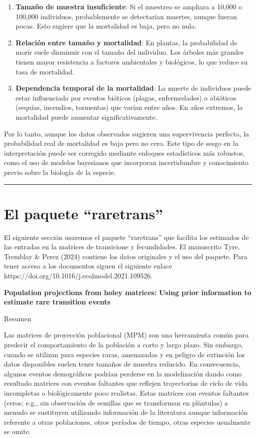 \documentclass[
  12pt,
  letterpaper,
]{book}
\begin{document}
\begin{enumerate}
\def\labelenumi{\arabic{enumi}.}
\item
  \textbf{Tamaño de muestra insuficiente}: Si el muestreo se ampliara a
  10,000 o 100,000 individuos, probablemente se detectarían muertes,
  aunque fueran pocas. Esto sugiere que la mortalidad es baja, pero no
  nula.
\item
  \textbf{Relación entre tamaño y mortalidad}: En plantas, la
  probabilidad de morir suele disminuir con el tamaño del individuo. Los
  árboles más grandes tienen mayor resistencia a factores ambientales y
  biológicos, lo que reduce su tasa de mortalidad.
\item
  \textbf{Dependencia temporal de la mortalidad}: La muerte de
  individuos puede estar influenciada por eventos bióticos (plagas,
  enfermedades) o abióticos (sequías, incendios, tormentas) que varían
  entre años. En años extremos, la mortalidad puede aumentar
  significativamente.
\end{enumerate}

Por lo tanto, aunque los datos observados sugieren una supervivencia
perfecta, la probabilidad real de mortalidad es baja pero no cero. Este
tipo de sesgo en la interpretación puede ser corregido mediante enfoques
estadísticos más robustos, como el uso de modelos bayesianos que
incorporan incertidumbre y conocimiento previo sobre la biología de la
especie.

\begin{center}\rule{0.5\linewidth}{0.5pt}\end{center}

\section{El paquete ``raretrans''}\label{el-paquete-raretrans}

El siguiente sección usaremos el paquete ``raretrans'' que facilita los
estimados de las entradas en la matrices de transicione y fecundidades.
El manuscrito Tyre, Tremblay \& Perez (2024) contiene los datos
originales y el uso del paquete. Para tener acceso a los documentos
siguen el siguiente enlace
https://doi.org/10.1016/j.ecolmodel.2021.109526.

\textbf{Population projections from holey matrices: Using prior
information to estimate rare transition events}

Resumen

Las matrices de proyección poblacional (MPM) son una herramienta común
para predecir el comportamiento de la población a corto y largo plazo.
Sin embargo, cuando se utilizan para especies raras, amenazadas y en
peligro de extinción los datos disponibles suelen tener tamaños de
muestra reducido. En consecuencia, algunos eventos demográficos podrían
perderse en la modelización dando como resultado matrices con eventos
faltantes que reflejen trayectorias de ciclo de vida incompletas o
biológicamente poco realistas. Estas matrices con eventos faltantes
(ceros; e.g., sin observación de semillas que se transforman en
plántulas) a menudo se sustituyen utilizando información de la
literatura aunque información referente a otras poblaciones, otros
períodos de tiempo, otras especies usualmente se omite.
\end{document}
